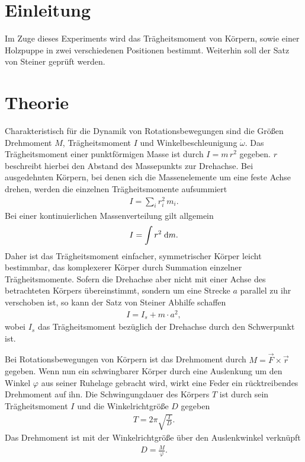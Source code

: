 
\section{Einleitung}
Im Zuge dieses Experiments wird das Trägheitsmoment von Körpern, sowie einer Holzpuppe in zwei verschiedenen Positionen bestimmt. 
Weiterhin soll der Satz von Steiner geprüft werden.

\section{Theorie}
Charakteristisch für die Dynamik von Rotationsbewegungen sind die Größen Drehmoment $M$, Trägheitsmoment $I$ und Winkelbeschleunigung
$\dot \omega$. Das Trägheitsmoment einer punktförmigen Masse ist durch $I = m\,r^2$ gegeben. $r$ beschreibt hierbei den Abstand des 
Massepunkts zur Drehachse. Bei ausgedehnten Körpern, bei denen sich die Massenelemente um eine feste Achse drehen, werden 
die einzelnen Trägheitsmomente aufsummiert
\begin{align}
 I = \sum_i r^2_i\,m_i.
\end{align}
Bei einer kontinuierlichen Massenverteilung gilt allgemein
\begin{align}
 I = \int r^2 \; \mathrm{d} m.
\end{align}
Daher ist das Trägheitsmoment einfacher, symmetrischer Körper leicht bestimmbar, das komplexerer Körper durch Summation einzelner 
Trägheitsmomente. Sofern die Drehachse aber nicht mit einer Achse des betrachteten Körpers übereinstimmt, sondern um eine Strecke $a$ 
parallel zu  ihr verschoben ist, so kann der Satz von Steiner Abhilfe schaffen
\begin{align}
 I = I_s + m \cdot a^2,
\end{align}
wobei $I_s$ das Trägheitsmoment bezüglich der Drehachse durch den Schwerpunkt ist. 

Bei Rotationsbewegungen von Körpern ist das Drehmoment durch $M = \vec{F} \times \vec{r}$ gegeben. Wenn nun ein schwingbarer Körper
durch eine Auslenkung um den Winkel $\varphi$ aus seiner Ruhelage gebracht wird, wirkt eine Feder ein rücktreibendes Drehmoment auf ihn.
Die Schwingungdauer des Körpers $T$ ist durch sein Trägheitsmoment $I$ und die Winkelrichtgröße $D$ gegeben
\begin{align}
 T = 2\pi \sqrt{\frac{I}{D}}.
 \label{eq_periode}
\end{align}
Das Drehmoment ist mit der Winkelrichtgröße über den Auslenkwinkel verknüpft
\begin{align}
 D = \frac{M}{\varphi}.
 \label{eq_winkel}
\end{align}

